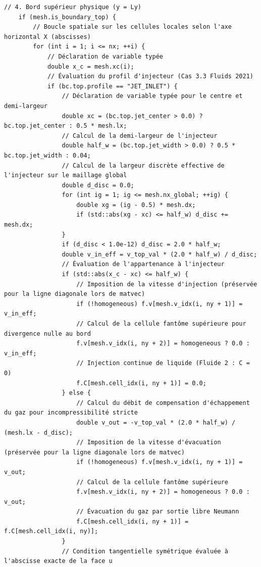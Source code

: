 \documentclass[10pt,a4paper,oneside]{book}
\begin{document}
\begin{lstlisting}[language={[11]C++}]
    // 4. Bord supérieur physique (y = Ly)
    if (mesh.is_boundary_top) {
        // Boucle spatiale sur les cellules locales selon l'axe horizontal X (abscisses)
        for (int i = 1; i <= nx; ++i) {
            // Déclaration de variable typée
            double x_c = mesh.xc(i);
            // Évaluation du profil d'injecteur (Cas 3.3 Fluids 2021)
            if (bc.top.profile == "JET_INLET") {
                // Déclaration de variable typée pour le centre et demi-largeur
                double xc = (bc.top.jet_center > 0.0) ? bc.top.jet_center : 0.5 * mesh.lx;
                // Calcul de la demi-largeur de l'injecteur
                double half_w = (bc.top.jet_width > 0.0) ? 0.5 * bc.top.jet_width : 0.04;
                // Calcul de la largeur discrète effective de l'injecteur sur le maillage global
                double d_disc = 0.0;
                for (int ig = 1; ig <= mesh.nx_global; ++ig) {
                    double xg = (ig - 0.5) * mesh.dx;
                    if (std::abs(xg - xc) <= half_w) d_disc += mesh.dx;
                }
                if (d_disc < 1.0e-12) d_disc = 2.0 * half_w;
                double v_in_eff = v_top_val * (2.0 * half_w) / d_disc;
                // Évaluation de l'appartenance à l'injecteur
                if (std::abs(x_c - xc) <= half_w) {
                    // Imposition de la vitesse d'injection (préservée pour la ligne diagonale lors de matvec)
                    if (!homogeneous) f.v[mesh.v_idx(i, ny + 1)] = v_in_eff;
                    // Calcul de la cellule fantôme supérieure pour divergence nulle au bord
                    f.v[mesh.v_idx(i, ny + 2)] = homogeneous ? 0.0 : v_in_eff;
                    // Injection continue de liquide (Fluide 2 : C = 0)
                    f.C[mesh.cell_idx(i, ny + 1)] = 0.0;
                } else {
                    // Calcul du débit de compensation d'échappement du gaz pour incompressibilité stricte
                    double v_out = -v_top_val * (2.0 * half_w) / (mesh.lx - d_disc);
                    // Imposition de la vitesse d'évacuation (préservée pour la ligne diagonale lors de matvec)
                    if (!homogeneous) f.v[mesh.v_idx(i, ny + 1)] = v_out;
                    // Calcul de la cellule fantôme supérieure
                    f.v[mesh.v_idx(i, ny + 2)] = homogeneous ? 0.0 : v_out;
                    // Évacuation du gaz par sortie libre Neumann
                    f.C[mesh.cell_idx(i, ny + 1)] = f.C[mesh.cell_idx(i, ny)];
                }
                // Condition tangentielle symétrique évaluée à l'abscisse exacte de la face u

\end{lstlisting}
\end{document}
